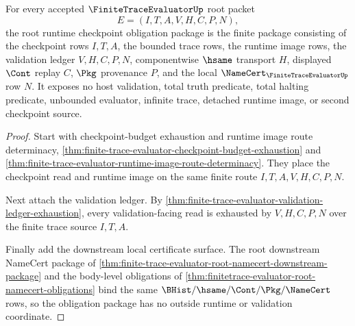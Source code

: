 \begin{theorem}
\label{thm:finite-trace-evaluator-root-runtime-checkpoint-obligation-package}
For every accepted $\FiniteTraceEvaluatorUp$ root packet
$$
E=(I,T,A,V,H,C,P,N),
$$
the root runtime checkpoint obligation package is the finite package consisting of the checkpoint rows $I,T,A$, the bounded trace rows, the runtime image rows, the validation ledger $V,H,C,P,N$, componentwise $\hsame$ transport $H$, displayed $\Cont$ replay $C$, $\Pkg$ provenance $P$, and the local $\NameCert_{\FiniteTraceEvaluatorUp}$ row $N$. It exposes no host validation, total truth predicate, total halting predicate, unbounded evaluator, infinite trace, detached runtime image, or second checkpoint source.
\end{theorem}
\begin{proof}
Start with checkpoint-budget exhaustion and runtime image route determinacy, \autoref{thm:finite-trace-evaluator-checkpoint-budget-exhaustion} and \autoref{thm:finite-trace-evaluator-runtime-image-route-determinacy}. They place the checkpoint read and runtime image on the same finite route $I,T,A,V,H,C,P,N$.

Next attach the validation ledger. By \autoref{thm:finite-trace-evaluator-validation-ledger-exhaustion}, every validation-facing read is exhausted by $V,H,C,P,N$ over the finite trace source $I,T,A$.

Finally add the downstream local certificate surface. The root downstream NameCert package of \autoref{thm:finite-trace-evaluator-root-namecert-downstream-package} and the body-level obligations of \autoref{thm:finitetrace-evaluator-root-namecert-obligations} bind the same $\BHist/\hsame/\Cont/\Pkg/\NameCert$ rows, so the obligation package has no outside runtime or validation coordinate.
\end{proof}

